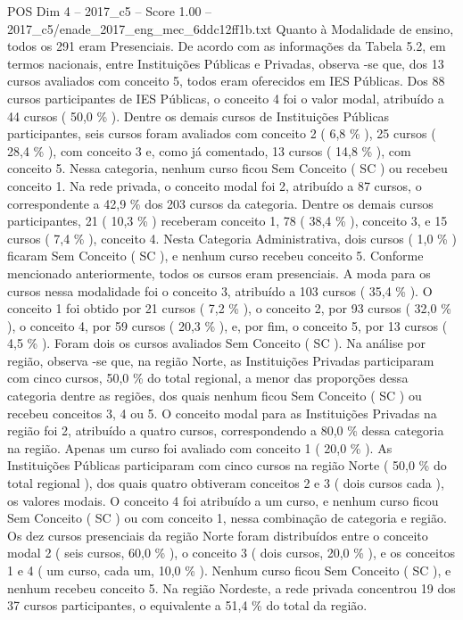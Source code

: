 \begin{textsample}{POS Dim 4 – 2017\_c5 – Score 1.00 – 2017\_c5/enade\_2017\_eng\_mec\_6ddc12ff1b.txt}
Quanto à Modalidade de ensino, todos os 291 eram Presenciais.
De acordo com as informações da Tabela 5.2, em termos nacionais, entre Instituições Públicas e Privadas, observa -se que, dos 13 cursos avaliados com conceito 5, todos eram oferecidos em IES Públicas.
Dos 88 cursos participantes de IES Públicas, o conceito 4 foi o valor modal, atribuído a 44 cursos ( 50,0 \% ).
Dentre os demais cursos de Instituições Públicas participantes, seis cursos foram avaliados com conceito 2 ( 6,8 \% ), 25 cursos ( 28,4 \% ), com conceito 3 e, como já comentado, 13 cursos ( 14,8 \% ), com conceito 5.
Nessa categoria, nenhum curso ficou Sem Conceito ( SC ) ou recebeu conceito 1.
Na rede privada, o conceito modal foi 2, atribuído a 87 cursos, o correspondente a 42,9 \% dos 203 cursos da categoria.
Dentre os demais cursos participantes, 21 ( 10,3 \% ) receberam conceito 1, 78 ( 38,4 \% ), conceito 3, e 15 cursos ( 7,4 \% ), conceito 4.
Nesta Categoria Administrativa, dois cursos ( 1,0 \% ) ficaram Sem Conceito ( SC ), e nenhum curso recebeu conceito 5.
Conforme mencionado anteriormente, todos os cursos eram presenciais.
A moda para os cursos nessa modalidade foi o conceito 3, atribuído a 103 cursos ( 35,4 \% ).
O conceito 1 foi obtido por 21 cursos ( 7,2 \% ), o conceito 2, por 93 cursos ( 32,0 \% ), o conceito 4, por 59 cursos ( 20,3 \% ), e, por fim, o conceito 5, por 13 cursos ( 4,5 \% ).
Foram dois os cursos avaliados Sem Conceito ( SC ).
Na análise por região, observa -se que, na região Norte, as Instituições Privadas participaram com cinco cursos, 50,0 \% do total regional, a menor das proporções dessa categoria dentre as regiões, dos quais nenhum ficou Sem Conceito ( SC ) ou recebeu conceitos 3, 4 ou 5.
O conceito modal para as Instituições Privadas na região foi 2, atribuído a quatro cursos, correspondendo a 80,0 \% dessa categoria na região.
Apenas um curso foi avaliado com conceito 1 ( 20,0 \% ).
As Instituições Públicas participaram com cinco cursos na região Norte ( 50,0 \% do total regional ), dos quais quatro obtiveram conceitos 2 e 3 ( dois cursos cada ), os valores modais.
O conceito 4 foi atribuído a um curso, e nenhum curso ficou Sem Conceito ( SC ) ou com conceito 1, nessa combinação de categoria e região.
Os dez cursos presenciais da região Norte foram distribuídos entre o conceito modal 2 ( seis cursos, 60,0 \% ), o conceito 3 ( dois cursos, 20,0 \% ), e os conceitos 1 e 4 ( um curso, cada um, 10,0 \% ).
Nenhum curso ficou Sem Conceito ( SC ), e nenhum recebeu conceito 5.
Na região Nordeste, a rede privada concentrou 19 dos 37 cursos participantes, o equivalente a 51,4 \% do total da região.

\end{textsample}

